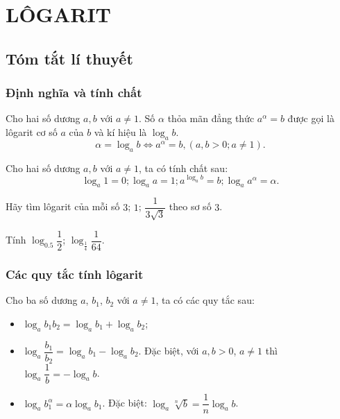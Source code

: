 \section{LÔGARIT}
\subsection{Tóm tắt lí thuyết}
\subsubsection{Định nghĩa và tính chất}
\begin{dn}
Cho hai số dương $a, b$ với $a\neq 1$. Số $\alpha$ thỏa mãn đẳng thức $a^{\alpha}=b$ được gọi là lôgarit cơ số $a$ của $b$ và kí hiệu là $\log_ab$.
$$\alpha=\log_ab \Leftrightarrow a^{\alpha}=b, (a,b>0; a\neq 1).$$
\end{dn}
\begin{tc}
Cho hai số dương $a, b$ với $a\neq 1$, ta có tính chất sau:
$$\log_a1=0; \log_aa=1; a^{\log_ab}=b; \log_aa^{\alpha}=\alpha.$$
\end{tc}
\begin{vd}%
Hãy tìm lôgarit của mỗi số $3$; $1$; $\dfrac{1}{3\sqrt{3}}$ theo sơ số $3$.
\end{vd}

\begin{vd}%
Tính $\log_{0.5}\dfrac{1}{2}$; $\log_{\frac{1}{4}}\dfrac{1}{64}$.
\end{vd}

\subsubsection{Các quy tắc tính lôgarit}
Cho ba số dương $a$, $b_1$, $b_2$ với $a\neq 1$, ta có các quy tắc sau:
\begin{itemize}
\item $\log_ab_1b_2=\log_ab_1+\log_ab_2$;
\item $\log_a\dfrac{b_1}{b_2}=\log_ab_1-\log_ab_2$. Đặc biệt, với $a, b>0$, $a\neq 1$ thì $\log_a\dfrac{1}{b}=-\log_ab$.
\item $\log_ab_1^{\alpha}=\alpha \log_ab_1$. Đặc biệt: $\log_a\sqrt[n]{b}=\dfrac{1}{n}\log_ab$.
\end{itemize}


